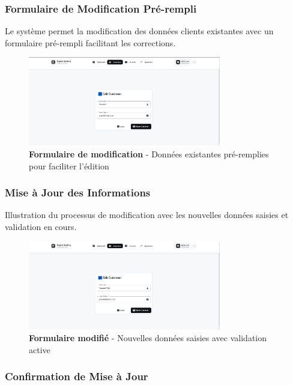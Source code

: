 \documentclass[11pt, a4paper]{article}
\begin{document}
\subsubsection{Formulaire de Modification Pré-rempli}

Le système permet la modification des données clients existantes avec un formulaire pré-rempli facilitant les corrections.

\begin{figure}[H]
    \centering
    \includegraphics[width=0.75\textwidth]{screenshots/04_05_customer_form_edit_prefilled.png}
    \caption{\textbf{Formulaire de modification} - Données existantes pré-remplies pour faciliter l'édition}
    \label{fig:customer_form_edit_prefilled}
\end{figure}

\subsubsection{Mise à Jour des Informations}

Illustration du processus de modification avec les nouvelles données saisies et validation en cours.

\begin{figure}[H]
    \centering
    \includegraphics[width=0.75\textwidth]{screenshots/04_06_customer_form_edit_filled.png}
    \caption{\textbf{Formulaire modifié} - Nouvelles données saisies avec validation active}
    \label{fig:customer_form_edit_filled}
\end{figure}

\subsubsection{Confirmation de Mise à Jour}
\end{document}
